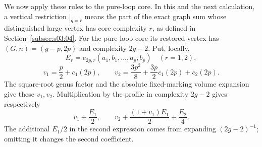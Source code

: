 We now apply these rules to the pure-loop core. In this and the next
calculation, a vertical restriction $\big|_{q=r}$ means the part of
the exact graph sum whose distinguished large vertex has core
complexity $r$, as defined in Section~\ref{subsec:s03:04}.
For the pure-loop core its restored vertex has $(G,n)=(g-p,2p)$ and
complexity $2g-2$. Put, locally,
\[
 E_r=e_{2p,r}(a_1,b_1,\ldots,a_p,b_p)\quad(r=1,2),
\]
\[
 v_1=\frac p2+c_1(2p),\qquad
 v_2=\frac{3p^2}{8}+\frac{3p}{2}c_1(2p)+c_2(2p).
\]
The square-root genus factor and the absolute fixed-marking volume
expansion give these $v_1,v_2$. Multiplication by the profile in
complexity $2g-2$ gives respectively
\begin{equation}\label{eq:a:pure-loop-polynomials}
 v_1+\frac{E_1}{2},\qquad
 v_2+\frac{(1+v_1)E_1}{2}+\frac{E_2}{4}.
\end{equation}
The additional $E_1/2$ in the second expression comes from expanding
$(2g-2)^{-1}$; omitting it changes the second coefficient.

